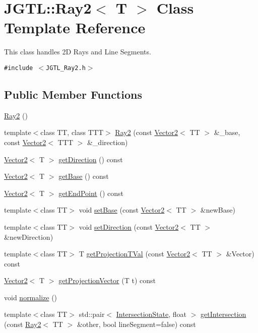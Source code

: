 \hypertarget{class_j_g_t_l_1_1_ray2}{
\section{JGTL::Ray2$<$ T $>$ Class Template Reference}
\label{class_j_g_t_l_1_1_ray2}
}
This class handles 2D Rays and Line Segments.  


{\tt \#include $<$JGTL\_\-Ray2.h$>$}

\subsection*{Public Member Functions}
\begin{CompactItemize}
\item 
\hyperlink{class_j_g_t_l_1_1_ray2_31284d7badc1d41327dbe9f968c66186}{Ray2} ()
\item 
template$<$class TT, class TTT$>$ \hyperlink{class_j_g_t_l_1_1_ray2_5ab2591d6df17a32373b34259913fbe2}{Ray2} (const \hyperlink{class_j_g_t_l_1_1_vector2}{Vector2}$<$ TT $>$ \&\_\-base, const \hyperlink{class_j_g_t_l_1_1_vector2}{Vector2}$<$ TTT $>$ \&\_\-direction)
\item 
\hyperlink{class_j_g_t_l_1_1_vector2}{Vector2}$<$ T $>$ \hyperlink{class_j_g_t_l_1_1_ray2_e3d5c3d3ba2693d7904dabfd6407cd32}{get\-Direction} () const
\item 
\hyperlink{class_j_g_t_l_1_1_vector2}{Vector2}$<$ T $>$ \hyperlink{class_j_g_t_l_1_1_ray2_151f4c434cde6776eb9183def4529944}{get\-Base} () const
\item 
\hyperlink{class_j_g_t_l_1_1_vector2}{Vector2}$<$ T $>$ \hyperlink{class_j_g_t_l_1_1_ray2_2b38de58f57dd042c582fe2f9aa9258a}{get\-End\-Point} () const
\item 
template$<$class TT$>$ void \hyperlink{class_j_g_t_l_1_1_ray2_188eb46e39c7240523863760a7afe756}{set\-Base} (const \hyperlink{class_j_g_t_l_1_1_vector2}{Vector2}$<$ TT $>$ \&new\-Base)
\item 
template$<$class TT$>$ void \hyperlink{class_j_g_t_l_1_1_ray2_cc31a907c03a3d013694d3f0ac476e47}{set\-Direction} (const \hyperlink{class_j_g_t_l_1_1_vector2}{Vector2}$<$ TT $>$ \&new\-Direction)
\item 
template$<$class TT$>$ T \hyperlink{class_j_g_t_l_1_1_ray2_32b3a18663a108c037713e0473180223}{get\-Projection\-TVal} (const \hyperlink{class_j_g_t_l_1_1_vector2}{Vector2}$<$ TT $>$ \&Vector) const 
\item 
\hyperlink{class_j_g_t_l_1_1_vector2}{Vector2}$<$ T $>$ \hyperlink{class_j_g_t_l_1_1_ray2_e59574fde082ff15adf09d6597782447}{get\-Projection\-Vector} (T t) const 
\item 
void \hyperlink{class_j_g_t_l_1_1_ray2_ac8af5ab11d2371da705144c47f2913b}{normalize} ()
\item 
template$<$class TT$>$ std::pair$<$ \hyperlink{namespace_j_g_t_l_84ea7d7d885581de216d16c16850615a}{Intersection\-State}, float $>$ \hyperlink{class_j_g_t_l_1_1_ray2_f520be1d874ef1679798e3c2b24a23ed}{get\-Intersection} (const \hyperlink{class_j_g_t_l_1_1_ray2}{Ray2}$<$ TT $>$ \&other, bool line\-Segment=false) const 
\end{CompactItemize}
